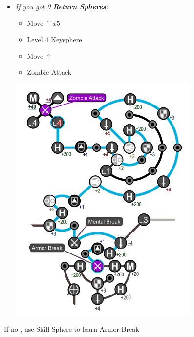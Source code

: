 \begin{spheregrid}
\begin{multicols}{2}
\begin{itemize}
\begin{itemize}
				      \item \textit{If you got 0 \textbf{Return Spheres}:}
				            \begin{itemize}
					            \item Move $\uparrow x5$
					            \item Level 4 Keysphere
					            \item Move $\uparrow$
					            \item Zombie Attack
				            \end{itemize}
						\includegraphics[width=.8\columnwidth]{graphics/Tidus_BFA}
			      \end{itemize}
				            \rikkuf If no \od, use Skill Sphere to learn Armor Break
		\end{itemize}
	\end{multicols}
\end{spheregrid}
